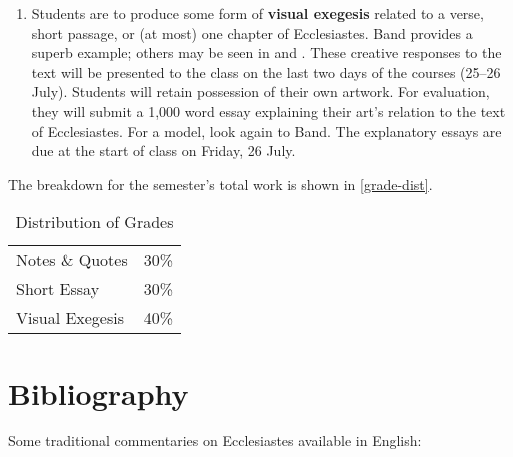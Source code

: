 \documentclass[titlepage]{article}
\newcommand\policy{../policy}
\begin{document}
\begin{enumerate}
	\item Students are to produce some form of \textbf{visual exegesis}
	related to a verse, short passage, or (at most) one chapter of
	Ecclesiastes. Band provides a superb example; others may be seen in
	\cite{Christianson} and \cite{Short}. These creative responses to
	the text will be presented to the class on the last two days of the
	courses (25–26 July). Students will retain possession of their own
	artwork. For evaluation, they will submit a 1,000 word essay
	explaining their art’s relation to the text of Ecclesiastes. For a
	model, look again to Band. The explanatory essays are due at the
	start of class on Friday, 26 July.

\end{enumerate}

The breakdown for the semester's total work is shown in
\autoref{grade-dist}.

\begin{table}[htbp]
  \centering
  {\lining
  \begin{tabular}{lr}
    \toprule
    Notes \& Quotes     & 30\% \\
    Short Essay         & 30\% \\
    Visual Exegesis     & 40\% \\
    \bottomrule
  \end{tabular}}
  \caption{Distribution of Grades}
  \label{grade-dist}
\end{table}





\section{Bibliography}
\label{bib}

Some traditional commentaries on Ecclesiastes available in English:
\end{document}
